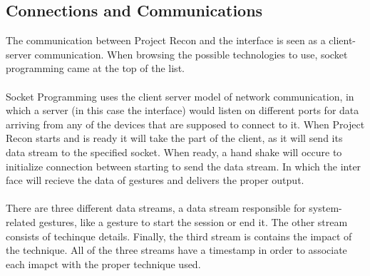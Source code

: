 \documentclass[11pt]{article} %
\begin{document}
\subsection{Connections and Communications}
The communication between Project Recon and the interface is seen as a client-server communication. When browsing the possible technologies to use, socket programming came at the top of the list.
\\
\\
Socket Programming uses the client server model of network communication, in which a server (in this case the interface) would listen on different ports for data arriving from any of the devices that are supposed to connect to it. When Project Recon starts and is ready it will take the part of the client, as it will send its data stream to the specified socket. When ready, a hand shake will occure to initialize connection between starting to send the data stream. In which the  inter face will recieve the data of gestures and delivers the proper output.
\\
\\
There are three different data streams, a data stream responsible for system-related gestures, like a gesture to start the session or end it. The other stream consists of techinque details. Finally, the third stream is contains the impact of the technique. All of the three streams have a timestamp in order to associate each imapct with the proper technique used.
\end{document}

